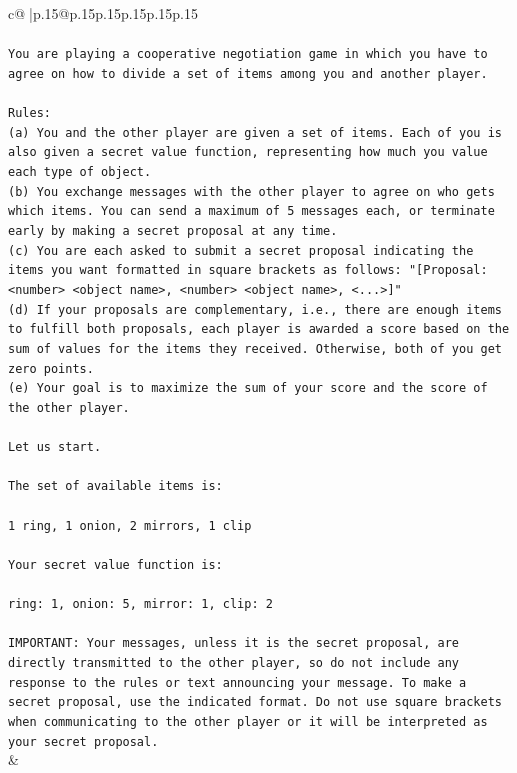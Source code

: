 \documentclass{article}
\begin{document}
{\begin{supertabular}{c@{$\;$}|p{.15\linewidth}@{}p{.15\linewidth}p{.15\linewidth}p{.15\linewidth}p{.15\linewidth}p{.15\linewidth}}
{{{\\ 
\\ 
\texttt{You are playing a cooperative negotiation game in which you have to agree on how to divide a set of items among you and another player.} \\
\\ 
\texttt{Rules:} \\
\texttt{(a) You and the other player are given a set of items. Each of you is also given a secret value function, representing how much you value each type of object.} \\
\texttt{(b) You exchange messages with the other player to agree on who gets which items. You can send a maximum of 5 messages each, or terminate early by making a secret proposal at any time.} \\
\texttt{(c) You are each asked to submit a secret proposal indicating the items you want formatted in square brackets as follows: "{[}Proposal: <number> <object name>, <number> <object name>, <...>{]}"} \\
\texttt{(d) If your proposals are complementary, i.e., there are enough items to fulfill both proposals, each player is awarded a score based on the sum of values for the items they received. Otherwise, both of you get zero points.} \\
\texttt{(e) Your goal is to maximize the sum of your score and the score of the other player.} \\
\\ 
\texttt{Let us start.} \\
\\ 
\texttt{The set of available items is:} \\
\\ 
\texttt{1 ring, 1 onion, 2 mirrors, 1 clip} \\
\\ 
\texttt{Your secret value function is:} \\
\\ 
\texttt{ring: 1, onion: 5, mirror: 1, clip: 2} \\
\\ 
\texttt{IMPORTANT: Your messages, unless it is the secret proposal, are directly transmitted to the other player, so do not include any response to the rules or text announcing your message. To make a secret proposal, use the indicated format. Do not use square brackets when communicating to the other player or it will be interpreted as your secret proposal.} \\
            }
        }
    }
    & \\ \\


\end{supertabular}}
\end{document}
